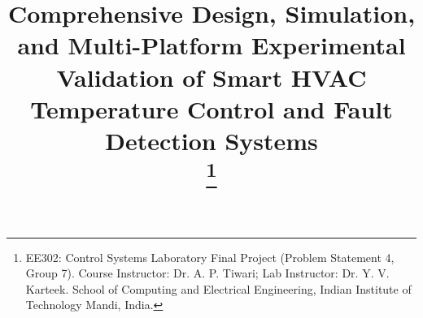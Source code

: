 \documentclass[conference]{IEEEtran}
\begin{document}
\title{Comprehensive Design, Simulation, and Multi-Platform Experimental Validation of Smart HVAC Temperature Control and Fault Detection Systems\\
\thanks{EE302: Control Systems Laboratory Final Project (Problem Statement 4, Group 7). Course Instructor: Dr. A. P. Tiwari; Lab Instructor: Dr. Y. V. Karteek. School of Computing and Electrical Engineering, Indian Institute of Technology Mandi, India.}
}

\author{
\and
{}
\and
{}
\and
{}
}

\maketitle
\end{document}
